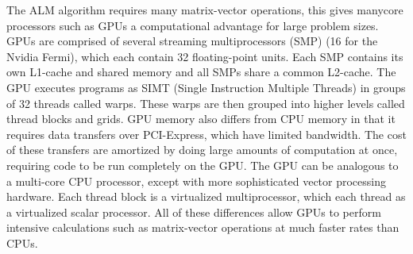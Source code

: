 \documentclass[10pt,twocolumn,letterpaper]{article}
\begin{document}
The ALM algorithm requires many matrix-vector operations, this gives manycore processors such as GPUs a computational advantage for large problem sizes.  
GPUs are comprised of several streaming multiprocessors (SMP) (16 for the Nvidia Fermi), which each contain 32 floating-point units.  Each SMP contains its own L1-cache and shared memory and all SMPs share a common L2-cache.  The GPU executes programs as SIMT (Single Instruction Multiple Threads) in groups of 32 threads called warps.  These warps are then grouped into higher levels called thread blocks and grids.
GPU memory also differs from CPU memory in that it requires data transfers over PCI-Express, which have limited bandwidth.  The cost of these transfers are amortized by doing large amounts of computation at once, requiring code to be run completely on the GPU.  The GPU can be analogous to a multi-core CPU processor, except with more sophisticated vector processing hardware.  Each thread block is a virtualized multiprocessor, which each thread as a virtualized scalar processor.  All of these differences allow GPUs to perform intensive calculations such as matrix-vector operations at much faster rates than CPUs. 



\end{document}
